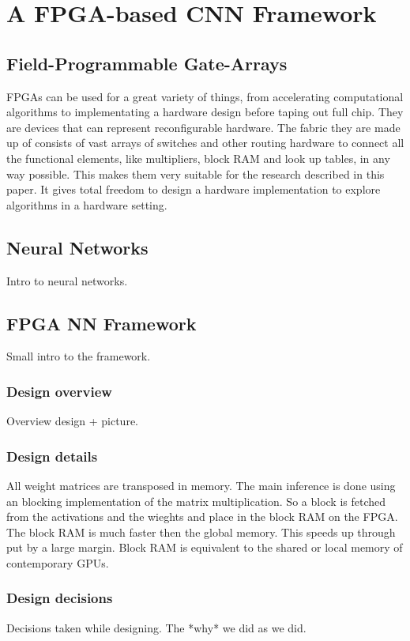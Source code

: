 \documentclass[techrep,english]{ipsj}
\begin{document}
\section{A FPGA-based CNN Framework}\label{sec:framework}
\subsection{Field-Programmable Gate-Arrays}
FPGAs can be used for a great variety of things, from accelerating computational algorithms to implementating a hardware design before taping out full chip.
They are devices that can represent reconfigurable hardware. 
The fabric they are made up of consists of vast arrays of switches and other routing hardware to connect all the functional elements, like multipliers, block RAM and look up tables, in any way possible.
This makes them very suitable for the research described in this paper.
It gives total freedom to design a hardware implementation to explore algorithms in a hardware setting.

\subsection{Neural Networks}
Intro to neural networks.

\subsection{FPGA NN Framework}
Small intro to the framework.
\subsubsection{Design overview}
Overview design + picture.
\subsubsection{Design details}
All weight matrices are transposed in memory.
The main inference is done using an blocking implementation of the matrix multiplication.
So a block is fetched from the activations and the wieghts and place in the block RAM on the FPGA.
The block RAM is much faster then the global memory.
This speeds up through put by a large margin.
Block RAM is equivalent to the shared or local memory of contemporary GPUs.

\subsubsection{Design decisions}
Decisions taken while designing. The *why* we did as we did.
\end{document}
